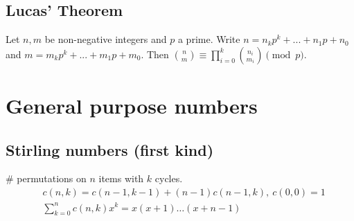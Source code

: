 	\subsection{Lucas' Theorem}
		Let $n,m$ be non-negative integers and $p$ a prime. Write $n=n_kp^k+...+n_1p+n_0$ and $m=m_kp^k+...+m_1p+m_0$. Then $\binom{n}{m} \equiv \prod_{i=0}^k\binom{n_i}{m_i} \pmod{p}$.


\section{General purpose numbers}


	\subsection{Stirling numbers (first kind)}
		\# permutations on $n$ items with $k$ cycles.
		\begin{align*}
			&c(n,k) = c(n-1,k-1) + (n-1) c(n-1,k),\ c(0,0) = 1 \\
			&\textstyle \sum_{k=0}^n c(n,k)x^k = x(x+1) \dots (x+n-1)
		\end{align*}

